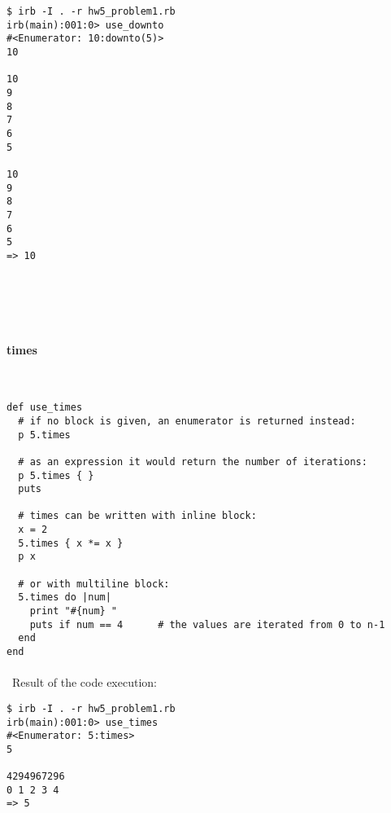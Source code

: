 \documentclass{article}
\begin{document}
\begin{verbatim} 
$ irb -I . -r hw5_problem1.rb
irb(main):001:0> use_downto
#<Enumerator: 10:downto(5)>
10

10
9
8
7
6
5

10
9
8
7
6
5
=> 10
\end{verbatim}

\paragraph{}\
\paragraph{}\



\paragraph{ times}\

\begin{verbatim}
def use_times
  # if no block is given, an enumerator is returned instead:
  p 5.times

  # as an expression it would return the number of iterations:
  p 5.times { }
  puts

  # times can be written with inline block:
  x = 2
  5.times { x *= x }
  p x

  # or with multiline block:
  5.times do |num|
    print "#{num} "
    puts if num == 4      # the values are iterated from 0 to n-1
  end
end
\end{verbatim}


\paragraph{}\
Result of the code execution:

\begin{verbatim} 
$ irb -I . -r hw5_problem1.rb
irb(main):001:0> use_times
#<Enumerator: 5:times>
5

4294967296
0 1 2 3 4
=> 5
\end{verbatim}


\paragraph{}\
\paragraph{}\
\end{document}
